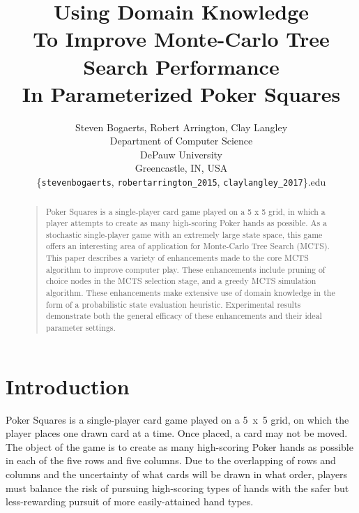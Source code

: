 \documentclass[letterpaper]{article}
\begin{document}
%
\title{Using Domain Knowledge\\To Improve Monte-Carlo Tree Search Performance\\In Parameterized Poker Squares}    %
\author{Steven Bogaerts, Robert Arrington, Clay Langley\\
Department of Computer Science\\
DePauw University\\
Greencastle, IN, USA\\
\{{\tt stevenbogaerts}, {\tt robertarrington\_2015}, {\tt claylangley\_2017}\}{\tt@depauw.edu}
}
\maketitle
\begin{abstract}
\begin{quote}
Poker Squares is a single-player card game played on a 5 x 5 grid, in which a player attempts to create as many high-scoring Poker hands as possible. As a stochastic single-player game with an extremely large state space, this game offers an interesting area of application for Monte-Carlo Tree Search (MCTS). This paper describes a variety of enhancements made to the core MCTS algorithm to improve computer play. These enhancements include pruning of choice nodes in the MCTS selection stage, and a greedy MCTS simulation algorithm. These enhancements make extensive use of domain knowledge in the form of a probabilistic state evaluation heuristic. Experimental results demonstrate both the general efficacy of these enhancements and their ideal parameter settings.
\end{quote}
\end{abstract}

\section{Introduction}
Poker Squares is a single-player card game played on a 5~x~5 grid, on which the player places one drawn card at a time. Once placed, a card may not be moved. The object of the game is to create as many high-scoring Poker hands as possible in each of the five rows and five columns. Due to the overlapping of rows and columns and the uncertainty of what cards will be drawn in what order, players must balance the risk of pursuing high-scoring types of hands with the safer but less-rewarding pursuit of more easily-attained hand types.
\end{document}
